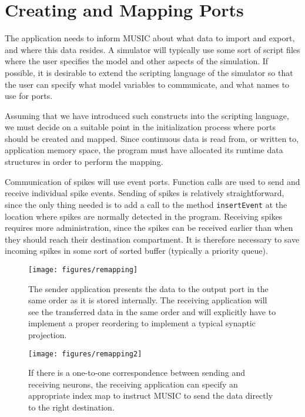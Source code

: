 \documentclass[a4paper,twoside]{report}
\begin{document}
\section{Creating and Mapping Ports}

The application needs to inform MUSIC about what data to import and
export, and where this data resides.  A simulator will typically use
some sort of script files where the user specifies the model and other
aspects of the simulation.  If possible, it is desirable to extend the
scripting language of the simulator so that the user can specify what
model variables to communicate, and what names to use for ports.

Assuming that we have introduced such constructs into the scripting
language, we must decide on a suitable point in the initialization
process where ports should be created and mapped.  Since continuous
data is read from, or written to, application memory space, the
program must have allocated its runtime data structures in order to
perform the mapping.

Communication of spikes will use event ports. Function calls are used
to send and receive individual spike events.  Sending of spikes is
relatively straightforward, since the only thing needed is to add a
call to the method \lstinline|insertEvent| at the location where
spikes are normally detected in the program.  Receiving spikes
requires more administration, since the spikes can be received earlier
than when they should reach their destination compartment.  It is
therefore necessary to save incoming spikes in some sort of sorted
buffer (typically a priority queue).

\begin{figure}
  \begin{center}
    \begin{minipage}[t]{0.45\textwidth}
      \texttt{[image: figures/remapping]}
      \caption[Processing of incoming data]{\label{fig:remapping1}
        The sender application presents the data to the output port in
        the same order as it is stored internally.  The receiving
        application will see the transferred data in the same order
        and will explicitly have to implement a proper reordering to
        implement a typical synaptic projection.
      }
    \end{minipage}
    \hfill
    \begin{minipage}[t]{0.45\textwidth}
      \texttt{[image: figures/remapping2]}
      \caption[Remapping of data within MUSIC]{\label{fig:remapping2}
        If there is a one-to-one correspondence between sending and
        receiving neurons, the receiving application can specify an
        appropriate index map to instruct MUSIC to send the data
        directly to the right destination.
      }
    \end{minipage}
  \end{center}
\end{figure}
\end{document}
